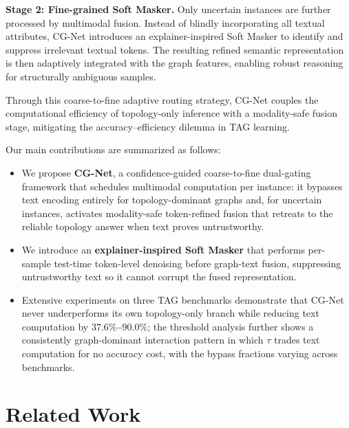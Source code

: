 \documentclass[preprint,12pt,authoryear]{elsarticle}
\begin{document}
\noindent\textbf{Stage 2: Fine-grained Soft Masker.}
Only uncertain instances are further processed by multimodal fusion. Instead of blindly incorporating all textual attributes, CG-Net introduces an explainer-inspired Soft Masker to identify and suppress irrelevant textual tokens. The resulting refined semantic representation is then adaptively integrated with the graph features, enabling robust reasoning for structurally ambiguous samples.

Through this coarse-to-fine adaptive routing strategy, CG-Net couples the computational efficiency of topology-only inference with a modality-safe fusion stage, mitigating the accuracy--efficiency dilemma in TAG learning.

\noindent Our main contributions are summarized as follows:
\begin{itemize}
    \item We propose \textbf{CG-Net}, a confidence-guided coarse-to-fine dual-gating framework that schedules multimodal computation per instance: it bypasses text encoding entirely for topology-dominant graphs and, for uncertain instances, activates modality-safe token-refined fusion that retreats to the reliable topology answer when text proves untrustworthy.
    \item We introduce an \textbf{explainer-inspired Soft Masker} that performs per-sample test-time token-level denoising before graph-text fusion, suppressing untrustworthy text so it cannot corrupt the fused representation.
    \item Extensive experiments on three TAG benchmarks demonstrate that CG-Net never underperforms its own topology-only branch while reducing text computation by \textbf{$37.6\%$--$90.0\%$}; the threshold analysis further shows a consistently graph-dominant interaction pattern in which $\tau$ trades text computation for no accuracy cost, with the bypass fractions varying across benchmarks.
\end{itemize}

\section{Related Work}
\end{document}
